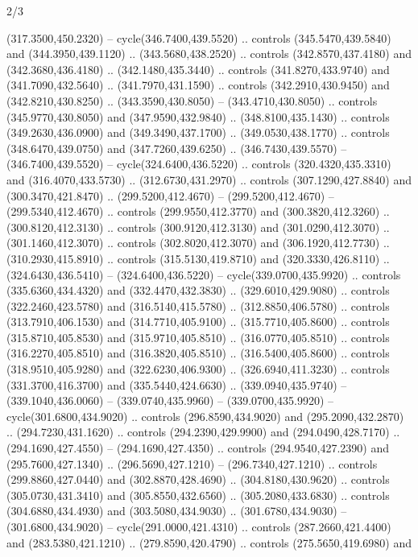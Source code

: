 \begin{flagdescription}{2/3}
\begin{scope}[xshift=0.5\flaglength]
\begin{scope}[scale=0.00209\flagwidth,yshift=170mm,xshift=-360]
\begin{scope}[y=-0.8pt, x=0.8pt, inner sep=0pt, outer sep=0pt]
  (317.3500,450.2320) -- cycle(346.7400,439.5520) .. controls
  (345.5470,439.5840) and (344.3950,439.1120) .. (343.5680,438.2520) .. controls
  (342.8570,437.4180) and (342.3680,436.4180) .. (342.1480,435.3440) .. controls
  (341.8270,433.9740) and (341.7090,432.5640) .. (341.7970,431.1590) .. controls
  (342.2910,430.9450) and (342.8210,430.8250) .. (343.3590,430.8050) --
  (343.4710,430.8050) .. controls (345.9770,430.8050) and (347.9590,432.9840) ..
  (348.8100,435.1430) .. controls (349.2630,436.0900) and (349.3490,437.1700) ..
  (349.0530,438.1770) .. controls (348.6470,439.0750) and (347.7260,439.6250) ..
  (346.7430,439.5570) -- (346.7400,439.5520) -- cycle(324.6400,436.5220) ..
  controls (320.4320,435.3310) and (316.4070,433.5730) .. (312.6730,431.2970) ..
  controls (307.1290,427.8840) and (300.3470,421.8470) .. (299.5200,412.4670) --
  (299.5200,412.4670) -- (299.5340,412.4670) .. controls (299.9550,412.3770) and
  (300.3820,412.3260) .. (300.8120,412.3130) .. controls (300.9120,412.3130) and
  (301.0290,412.3070) .. (301.1460,412.3070) .. controls (302.8020,412.3070) and
  (306.1920,412.7730) .. (310.2930,415.8910) .. controls (315.5130,419.8710) and
  (320.3330,426.8110) .. (324.6430,436.5410) -- (324.6400,436.5220) --
  cycle(339.0700,435.9920) .. controls (335.6360,434.4320) and
  (332.4470,432.3830) .. (329.6010,429.9080) .. controls (322.2460,423.5780) and
  (316.5140,415.5780) .. (312.8850,406.5780) .. controls (313.7910,406.1530) and
  (314.7710,405.9100) .. (315.7710,405.8600) .. controls (315.8710,405.8530) and
  (315.9710,405.8510) .. (316.0770,405.8510) .. controls (316.2270,405.8510) and
  (316.3820,405.8510) .. (316.5400,405.8600) .. controls (318.9510,405.9280) and
  (322.6230,406.9300) .. (326.6940,411.3230) .. controls (331.3700,416.3700) and
  (335.5440,424.6630) .. (339.0940,435.9740) -- (339.1040,436.0060) --
  (339.0740,435.9960) -- (339.0700,435.9920) -- cycle(301.6800,434.9020) ..
  controls (296.8590,434.9020) and (295.2090,432.2870) .. (294.7230,431.1620) ..
  controls (294.2390,429.9900) and (294.0490,428.7170) .. (294.1690,427.4550) --
  (294.1690,427.4350) .. controls (294.9540,427.2390) and (295.7600,427.1340) ..
  (296.5690,427.1210) -- (296.7340,427.1210) .. controls (299.8860,427.0440) and
  (302.8870,428.4690) .. (304.8180,430.9620) .. controls (305.0730,431.3410) and
  (305.8550,432.6560) .. (305.2080,433.6830) .. controls (304.6880,434.4930) and
  (303.5080,434.9030) .. (301.6780,434.9030) -- (301.6800,434.9020) --
  cycle(291.0000,421.4310) .. controls (287.2660,421.4400) and
  (283.5380,421.1210) .. (279.8590,420.4790) .. controls (275.5650,419.6980) and

\end{scope}
\end{scope}
\end{scope}
\end{flagdescription}
